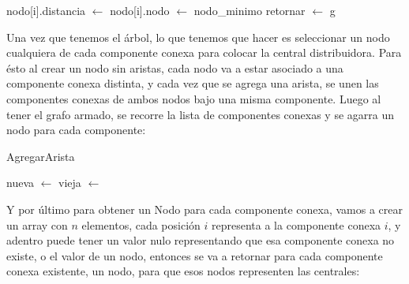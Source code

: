 \begin{algorithmic}[1]
						\State nodo[i].distancia $\gets$ \Call{Distancia}{ciudades[i], ciudades[nodo\_minimo}
						\State nodo[i].nodo $\gets$ nodo\_minimo
					\EndIf
				\EndIf
			\EndFor \label{ej_2:pseudo:fin_actualiza}
		\EndFor \label{ej_2:pseudo:fin_crea_arbol}
		\Statex
		\State {}  \label{ej_2:pseudo:sort}
		\Statex
		 \label{ej_2:pseudo:componentes}
		\State {} 
		\EndFor \label{ej_2:pseudo:fin_componentes}
		\State retornar $\gets$ g
	\EndProcedure
\end{algorithmic}

Una vez que tenemos el \'arbol, lo que tenemos que hacer es seleccionar un nodo cualquiera de cada componente conexa para colocar la central distribuidora. Para \'esto al crear un nodo sin aristas, cada nodo va a estar asociado a una componente conexa distinta, y cada vez que se agrega una arista, se unen las componentes conexas de ambos nodos bajo una misma componente. Luego al tener el grafo armado, se recorre la lista de componentes conexas y se agarra un nodo para cada componente:

\begin{algorithm}[!h]
\caption{AgregarArista} \label{ej_2:pseudo_agregar_arista}
\end{algorithm}
\begin{algorithmic}[1]
		\State {} 
			\State nueva $\gets$ 
			\State vieja $\gets$ 
			 
					\State {}
				\EndIf
			\EndFor
		\EndIf
	\EndProcedure
\end{algorithmic}

Y por \'ultimo para obtener un Nodo para cada componente conexa, vamos a crear un array con $n$ elementos, cada posici\'on $i$ representa a la componente conexa $i$, y adentro puede tener un valor nulo representando que esa componente conexa no existe, o el valor de un nodo, entonces se va a retornar para cada componente conexa existente, un nodo, para que esos nodos representen las centrales:

